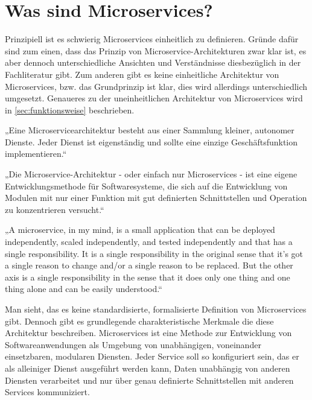 


\chapter{Was sind Microservices?}\label{sec:microservices}

Prinzipiell ist es schwierig Microservices einheitlich zu definieren. Gründe dafür sind zum einen, dass das Prinzip von Microservice-Architekturen zwar klar ist, es aber dennoch unterschiedliche Ansichten und Verständnisse  diesbezüglich in der Fachliteratur gibt. Zum anderen gibt es keine einheitliche Architektur von Microservices, bzw. das Grundprinzip ist klar, dies wird allerdings unterschiedlich umgesetzt. Genaueres zu der uneinheitlichen Architektur von Microservices wird in \ref{sec:funktionsweise} beschrieben.\newline\newline 

„Eine Microservicearchitektur besteht aus einer Sammlung kleiner, autonomer Dienste. Jeder Dienst ist eigenständig und sollte eine einzige Geschäftsfunktion implementieren.“\cite{microsoft}\newline\newline 

„Die Microservice-Architektur - oder einfach nur Microservices - ist eine eigene Entwicklungsmethode für Softwaresysteme, die sich auf die Entwicklung von Modulen mit nur einer Funktion mit gut definierten Schnittstellen und Operation zu konzentrieren versucht.“\cite{smartbear}\newline\newline 

„A microservice, in my mind, is a small application that can be deployed independently, scaled independently, and tested independently and that has a single responsibility. It is a single responsibility in the original sense that it's got a single reason to change and/or a single reason to be replaced. But the other axis is a single responsibility in the sense that it does only one thing and one thing alone and can be easily understood.“\cite{ieeetalk}\newline\newline 

Man sieht, das es keine standardisierte, formalisierte Definition von Microservices gibt. Dennoch gibt es grundlegende charakteristische Merkmale die diese Architektur beschreiben.\newline
Microservices ist eine Methode zur Entwicklung von Softwareanwendungen als Umgebung von unabhängigen, voneinander einsetzbaren, modularen Diensten. Jeder Service soll so konfiguriert sein, das er als alleiniger Dienst ausgeführt werden kann, Daten unabhängig von anderen Diensten verarbeitet und nur über genau definierte Schnittstellen mit anderen Services kommuniziert.\cite{keyhole}\newline

